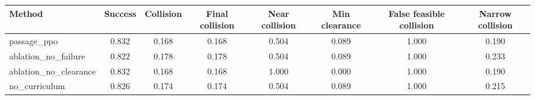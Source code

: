 \begin{tabular}{lccccccc}
\toprule
Method & Success & Collision & Final collision & Near collision & Min clearance & False feasible collision & Narrow collision \\
\midrule
passage_ppo & 0.832 & 0.168 & 0.168 & 0.504 & 0.089 & 1.000 & 0.190 \\
ablation_no_failure & 0.822 & 0.178 & 0.178 & 0.504 & 0.089 & 1.000 & 0.233 \\
ablation_no_clearance & 0.832 & 0.168 & 0.168 & 1.000 & 0.000 & 1.000 & 0.190 \\
no_curriculum & 0.826 & 0.174 & 0.174 & 0.504 & 0.089 & 1.000 & 0.215 \\
\bottomrule
\end{tabular}
